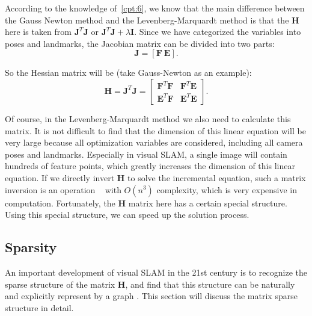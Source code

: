 According to the knowledge of~\ref{cpt:6}, we know that the main difference between the Gauss Newton method and the Levenberg-Marquardt method is that the $\mathbf{H}$ here is taken from $\mathbf{J }^T\mathbf{J}$ or $\mathbf{J}^T\mathbf{J}+ \lambda \mathbf{I}$. Since we have categorized the variables into poses and landmarks, the Jacobian matrix can be divided into two parts:
\begin{equation}
	\mathbf{J}=[\mathbf{F} \ \mathbf{E}].
\end{equation}

So the Hessian matrix will be (take Gauss-Newton as an example): 
\begin{equation}\label{eq:HessianMatrix}
	\mathbf{H} = \mathbf{J}^T\mathbf{J} =
	\begin{bmatrix}
		\mathbf{F}^T\mathbf{F}   &   \mathbf{F}^T\mathbf{E}   \\ 
		\mathbf{E}^T\mathbf{F}   &   \mathbf{E}^T\mathbf{E}
	\end{bmatrix} .
\end{equation}

Of course, in the Levenberg-Marquardt method we also need to calculate this matrix. It is not difficult to find that the dimension of this linear equation will be very large because all optimization variables are considered, including all camera poses and landmarks. Especially in visual SLAM, a single image will contain hundreds of feature points, which greatly increases the dimension of this linear equation. If we directly invert $\mathbf{H}$ to solve the incremental equation, such a matrix inversion is an operation ~\cite{Sueli2003} with $O(n^3)$ complexity, which is very expensive in computation. Fortunately, the $\mathbf{H}$ matrix here has a certain special structure. Using this special structure, we can speed up the solution process.

\subsection{Sparsity}
An important development of visual SLAM in the 21st century is to recognize the sparse structure of the matrix $\mathbf{H}$, and find that this structure can be naturally and explicitly represent by a graph  {\cite{Kummerle2011, Polok2013}}. This section will discuss the matrix sparse structure in detail.

